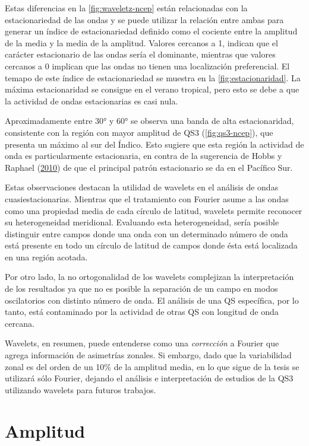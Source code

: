 \documentclass[spanish,a4paper,12p]{book}
\begin{document}
Estas diferencias en la \autoref{fig:waveletz-ncep} están relacionadas
con la estacionariedad de las ondas y se puede utilizar la relación
entre ambas para generar un índice de estacionariedad definido como el
cociente entre la amplitud de la media y la media de la amplitud.
Valores cercanos a 1, indican que el carácter estacionario de las ondas
sería el dominante, mientras que valores cercanos a 0 implican que las
ondas no tienen una localización preferencial. El temapo de este índice
de estacionariedad se muestra en la \autoref{fig:estacionaridad}. La
máxima estacionaridad se consigue en el verano tropical, pero esto se
debe a que la actividad de ondas estacionarias es casi nula.

Aproximadamente entre 30° y 60° se observa una banda de alta
estacionaridad, consistente con la región con mayor amplitud de QS3
(\autoref{fig:qs3-ncep}), que presenta un máximo al sur del Índico. Esto
sugiere que esta región la actividad de onda es particularmente
estacionaria, en contra de la sugerencia de Hobbs y Raphael
(\protect\hyperlink{ref-Hobbs2010}{2010}) de que el principal patrón
estacionario se da en el Pacífico Sur.

Estas observaciones destacan la utilidad de wavelets en el análisis de
ondas cuasiestacionarias. Mientras que el tratamiento con Fourier asume
a las ondas como una propiedad media de cada círculo de latitud,
wavelets permite reconocer su heterogeneidad meridional. Evaluando esta
heterogeneidad, sería posible distinguir entre campos donde una onda con
un determinado número de onda está presente en todo un círculo de
latitud de campos donde ésta está localizada en una región acotada.

Por otro lado, la no ortogonalidad de los wavelets complejizan la
interpretación de los resultados ya que no es posible la separación de
un campo en modos oscilatorios con distinto número de onda. El análisis
de una QS específica, por lo tanto, está contaminado por la actividad de
otras QS con longitud de onda cercana.

Wavelets, en resumen, puede entenderse como una \emph{corrección} a
Fourier que agrega información de asimetrías zonales. Si embargo, dado
que la variabilidad zonal es del orden de un 10\% de la amplitud media,
en lo que sigue de la tesis se utilizará sólo Fourier, dejando el
análisis e interpretación de estudios de la QS3 utilizando wavelets para
futuros trabajos.

\section{Amplitud}\label{amplitud}
\end{document}
